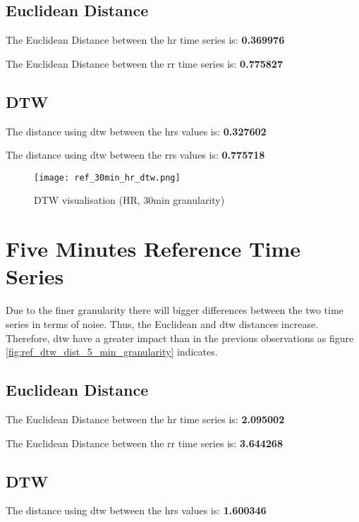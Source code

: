 \subsection{Euclidean Distance}

The Euclidean Distance between the \ac{hr} time series is: \textbf{0.369976}


The Euclidean Distance between the \ac{rr} time series is: \textbf{0.775827}


\subsection{DTW}

The distance using \ac{dtw} between the \acp{hr} values is: \textbf{0.327602}


The distance using \ac{dtw} between the \acp{rr} values is: \textbf{0.775718}

\begin{figure}[h!]
	\texttt{[image: ref\_30min\_hr\_dtw.png]}
	\caption{DTW visualisation (HR, 30min granularity)}
	\label{fig:ref_dtw_dist_30_min_granularity}
\end{figure}


\clearpage
\section{Five Minutes Reference Time Series}

Due to the finer granularity there will bigger differences between the two time series in terms of noise. Thus, the Euclidean and \ac{dtw} distances increase. Therefore, \ac{dtw} have a greater impact than in the previous observations as figure \ref{fig:ref_dtw_dist_5_min_granularity} indicates.

\subsection{Euclidean Distance}

The Euclidean Distance between the \ac{hr} time series is: \textbf{2.095002}


The Euclidean Distance between the \ac{rr} time series is: \textbf{3.644268}


\subsection{DTW}

The distance using \ac{dtw} between the \acp{hr} values is: \textbf{1.600346}


